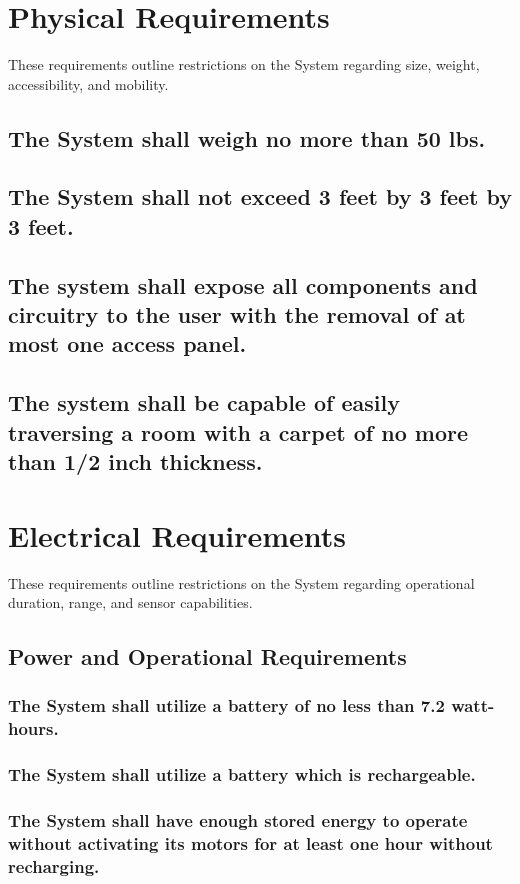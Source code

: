 \documentclass[12pt]{article}
\begin{document}
\section{Physical Requirements}
These requirements outline restrictions on the System regarding size, weight, accessibility, and mobility.
\subsection{The System shall weigh no more than 50 lbs.}
\subsection{The System shall not exceed 3 feet by 3 feet by 3 feet.}
\subsection{The system shall expose all components and circuitry to the user with the removal of at most one access panel.}
\subsection{The system shall be capable of easily traversing a room with a carpet of no more than 1/2 inch thickness.}

\section{Electrical Requirements}
These requirements outline restrictions on the System regarding operational duration, range, and sensor capabilities.

\subsection{Power and Operational Requirements}
\subsubsection{The System shall utilize a battery of no less than 7.2 watt-hours.}
\subsubsection{The System shall utilize a battery which is rechargeable.}
\subsubsection{The System shall have enough stored energy to operate without activating its motors for at least one hour without recharging.}
\end{document}
